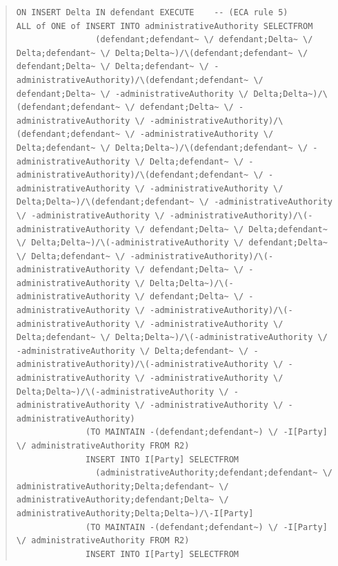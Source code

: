 \documentclass[10pt,a4paper]{report}              %
\theoremstyle{plain}\theorembodyfont{\rmfamily}\newtheorem{definition}{Definition}[section]
\theoremstyle{plain}\theorembodyfont{\rmfamily}\newtheorem{designrule}[definition]{Requirement}
\begin{document}
\begin{quote}
\begin{verbatim}
ON INSERT Delta IN defendant EXECUTE    -- (ECA rule 5)
ALL of ONE of INSERT INTO administrativeAuthority SELECTFROM
                (defendant;defendant~ \/ defendant;Delta~ \/ Delta;defendant~ \/ Delta;Delta~)/\(defendant;defendant~ \/ defendant;Delta~ \/ Delta;defendant~ \/ -administrativeAuthority)/\(defendant;defendant~ \/ defendant;Delta~ \/ -administrativeAuthority \/ Delta;Delta~)/\(defendant;defendant~ \/ defendant;Delta~ \/ -administrativeAuthority \/ -administrativeAuthority)/\(defendant;defendant~ \/ -administrativeAuthority \/ Delta;defendant~ \/ Delta;Delta~)/\(defendant;defendant~ \/ -administrativeAuthority \/ Delta;defendant~ \/ -administrativeAuthority)/\(defendant;defendant~ \/ -administrativeAuthority \/ -administrativeAuthority \/ Delta;Delta~)/\(defendant;defendant~ \/ -administrativeAuthority \/ -administrativeAuthority \/ -administrativeAuthority)/\(-administrativeAuthority \/ defendant;Delta~ \/ Delta;defendant~ \/ Delta;Delta~)/\(-administrativeAuthority \/ defendant;Delta~ \/ Delta;defendant~ \/ -administrativeAuthority)/\(-administrativeAuthority \/ defendant;Delta~ \/ -administrativeAuthority \/ Delta;Delta~)/\(-administrativeAuthority \/ defendant;Delta~ \/ -administrativeAuthority \/ -administrativeAuthority)/\(-administrativeAuthority \/ -administrativeAuthority \/ Delta;defendant~ \/ Delta;Delta~)/\(-administrativeAuthority \/ -administrativeAuthority \/ Delta;defendant~ \/ -administrativeAuthority)/\(-administrativeAuthority \/ -administrativeAuthority \/ -administrativeAuthority \/ Delta;Delta~)/\(-administrativeAuthority \/ -administrativeAuthority \/ -administrativeAuthority \/ -administrativeAuthority)
              (TO MAINTAIN -(defendant;defendant~) \/ -I[Party] \/ administrativeAuthority FROM R2)
              INSERT INTO I[Party] SELECTFROM
                (administrativeAuthority;defendant;defendant~ \/ administrativeAuthority;Delta;defendant~ \/ administrativeAuthority;defendant;Delta~ \/ administrativeAuthority;Delta;Delta~)/\-I[Party]
              (TO MAINTAIN -(defendant;defendant~) \/ -I[Party] \/ administrativeAuthority FROM R2)
              INSERT INTO I[Party] SELECTFROM

\end{verbatim}
\end{quote}
\end{document}
